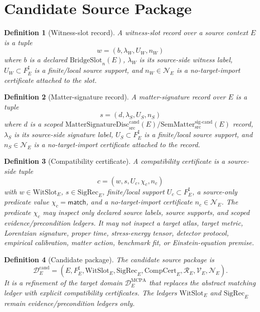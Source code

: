 \documentclass[11pt]{article}
\newcommand{\SemMatterSig}{\mathrm{SemMatter}_{\mathrm{src}}^{\mathrm{sig\text{-}cand}}}
\newcommand{\MatSigDisc}{\mathrm{MatterSignatureDisc}_{\mathrm{src}}^{\mathrm{cand}}}
\newcommand{\BridgeSlot}{\mathrm{BridgeSlot}}
\newcommand{\WitSlot}{\mathrm{WitSlot}}
\newcommand{\SigRec}{\mathrm{SigRec}}
\newcommand{\CompCert}{\mathrm{CompCert}}
\newtheorem{definition}{Definition}
\begin{document}
\section{Candidate Source Package}

\begin{definition}[Witness-slot record]
A witness-slot record over a source context \(E\) is a tuple
\[
  w=(b,\lambda_W,U_W,n_W)
\]
where \(b\) is a declared \(\BridgeSlot_n(E)\), \(\lambda_W\) is its
source-side witness label, \(U_W\subset F_E^\sharp\) is a finite/local source
support, and \(n_W\in\mathcal{N}_E\) is a no-target-import certificate
attached to the slot.
\end{definition}

\begin{definition}[Matter-signature record]
A matter-signature record over \(E\) is a tuple
\[
  s=(d,\lambda_S,U_S,n_S)
\]
where \(d\) is a scoped \(\MatSigDisc(E) / \SemMatterSig(E)\) record,
\(\lambda_S\) is its source-side signature label, \(U_S\subset F_E^\sharp\)
is a finite/local source support, and \(n_S\in\mathcal{N}_E\) is a
no-target-import certificate attached to the record.
\end{definition}

\begin{definition}[Compatibility certificate]
A compatibility certificate is a source-side tuple
\[
  c=(w,s,U_c,\chi_c,n_c)
\]
with \(w\in\WitSlot_E\), \(s\in\SigRec_E\), finite/local support
\(U_c\subset F_E^\sharp\), a source-only predicate value
\(\chi_c=\mathsf{match}\), and a no-target-import certificate
\(n_c\in\mathcal{N}_E\). The predicate \(\chi_c\) may inspect only declared
source labels, source supports, and scoped evidence/precondition ledgers. It
may not inspect a target atlas, target metric, Lorentzian signature, proper
time, stress-energy tensor, detector protocol, empirical calibration, matter
action, benchmark fit, or Einstein-equation premise.
\end{definition}

\begin{definition}[Candidate package]
The candidate source package is
\[
  \mathcal{D}^{\mathrm{cand}}_E =
  (E,F_E^\sharp,\WitSlot_E,\SigRec_E,\CompCert_E,\mathcal{R}_E,
   \mathcal{V}_E,\mathcal{N}_E).
\]
It is a refinement of the target domain \(\mathcal{D}^{\mathrm{MCPA}}_E\)
that replaces the abstract matching ledger with explicit compatibility
certificates. The ledgers \(\WitSlot_E\) and \(\SigRec_E\) remain
evidence/precondition ledgers only.
\end{definition}
\end{document}
